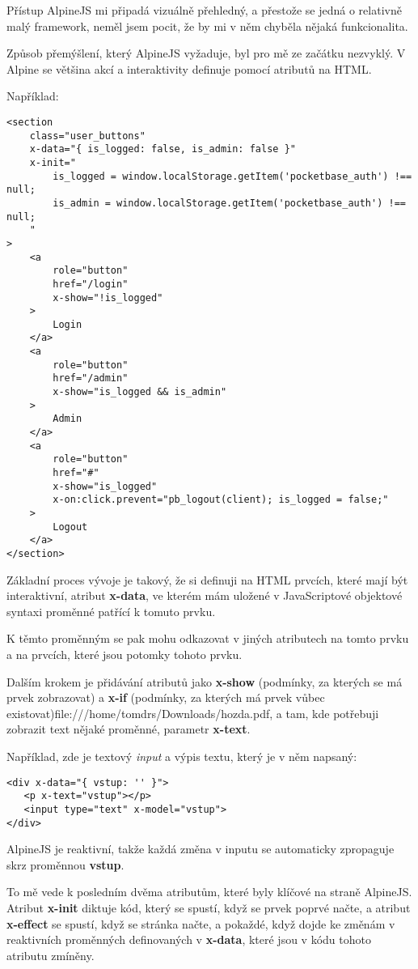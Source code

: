 \documentclass[11pt,a4paper,twoside,openright]{report}
\begin{document}
Přístup AlpineJS mi připadá vizuálně přehledný, a přestože se jedná o relativně malý framework, neměl jsem
pocit, že by mi v něm chyběla nějaká funkcionalita.

Způsob přemýšlení, který AlpineJS vyžaduje, byl pro mě ze začátku nezvyklý. V Alpine se většina akcí a interaktivity
definuje pomocí atributů na HTML.

Například:

\begin{verbatim}
<section
	class="user_buttons"
	x-data="{ is_logged: false, is_admin: false }"
	x-init="
		is_logged = window.localStorage.getItem('pocketbase_auth') !== null;
		is_admin = window.localStorage.getItem('pocketbase_auth') !== null;
	"
>
    <a
    	role="button"
    	href="/login"
    	x-show="!is_logged"
    >
    	Login
    </a>
    <a
    	role="button"
    	href="/admin"
    	x-show="is_logged && is_admin"
    >
        Admin
    </a>
    <a
        role="button"
        href="#"
        x-show="is_logged"
        x-on:click.prevent="pb_logout(client); is_logged = false;"
    >
    	Logout
    </a>
</section>
\end{verbatim}

Základní proces vývoje je takový, že si definuji na HTML prvcích, které mají být interaktivní,
atribut \textbf{x-data}, ve kterém mám uložené v JavaScriptové objektové syntaxi proměnné patřící
k tomuto prvku.

K těmto proměnným se pak mohu odkazovat v jiných atributech na tomto prvku a na prvcích, které jsou
potomky tohoto prvku.

Dalším krokem je přidávání atributů jako \textbf{x-show} (podmínky, za kterých se má prvek zobrazovat)
a \textbf{x-if} (podmínky, za kterých má prvek vůbec existovat)file:///home/tomdrs/Downloads/hozda.pdf, a tam, kde potřebuji zobrazit text
nějaké proměnné, parametr \textbf{x-text}.

Například, zde je textový \emph{input} a výpis textu, který je v něm napsaný:

\begin{verbatim}
<div x-data="{ vstup: '' }">
   <p x-text="vstup"></p>
   <input type="text" x-model="vstup">
</div>
\end{verbatim}

AlpineJS je reaktivní, takže každá změna v inputu se automaticky zpropaguje skrz proměnnou \textbf{vstup}.

To mě vede k posledním dvěma atributům, které byly klíčové na straně AlpineJS. Atribut \textbf{x-init}
diktuje kód, který se spustí, když se prvek poprvé načte, a atribut \textbf{x-effect} se spustí, když
se stránka načte, a pokaždé, když dojde ke změnám v reaktivních proměnných definovaných v \textbf{x-data},
které jsou v kódu tohoto atributu zmíněny.
\end{document}
